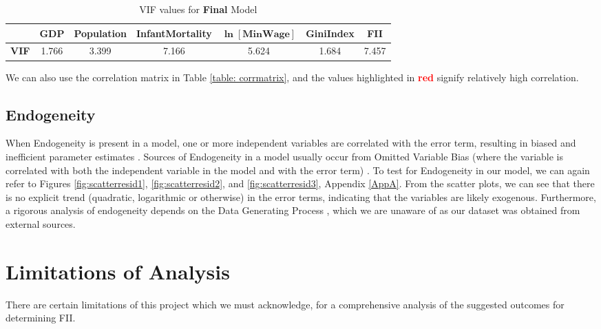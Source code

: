 \documentclass{article}
\begin{document}
\begin{table}[H]
    \centering
        \begin{threeparttable}
            \begin{tabular}{c c c c c c c}
              \toprule & \textbf{GDP} & \textbf{Population} & \textbf{InfantMortality} & \textbf{$\bm{\ln{[\text{MinWage}]}}$} & \textbf{GiniIndex} & \textbf{FII} \\ \midrule 
            \textbf{VIF} & 1.766 & 3.399 & 7.166 & 5.624 & 1.684 & 7.457 \\ \bottomrule
            \end{tabular}
        \end{threeparttable}
    \caption{\label{table: viftable}VIF values for \textbf{Final} Model}
\end{table}

\noindent We can also use the correlation matrix in Table \ref{table: corrmatrix}, and the values highlighted in \textcolor{red}{\textbf{red}} signify relatively high correlation.


\subsection{Endogeneity}\label{sec:endogeneity}
When Endogeneity is present in a model, one or more independent variables are correlated with the error term, resulting in biased and inefficient parameter estimates \cite{endogeneity}. Sources of Endogeneity in a model usually occur from Omitted Variable Bias (where the variable is correlated with both the independent variable in the model and with the error term) \cite{OVB}. To test for Endogeneity in our model, we can again refer to Figures \ref{fig:scatterresid1}, \ref{fig:scatterresid2}, and \ref{fig:scatterresid3}, Appendix \ref{AppA}. From the scatter plots, we can see that there is no explicit trend (quadratic, logarithmic or otherwise) in the error terms, indicating that the variables are likely exogenous. Furthermore, a rigorous analysis of endogeneity depends on the Data Generating Process \cite{DGP}, which we are unaware of as our dataset was obtained from external sources. 

\section{Limitations of Analysis}\label{limitations}
There are certain limitations of this project which we must acknowledge, for a comprehensive analysis of the suggested outcomes for determining FII. 
\end{document}
